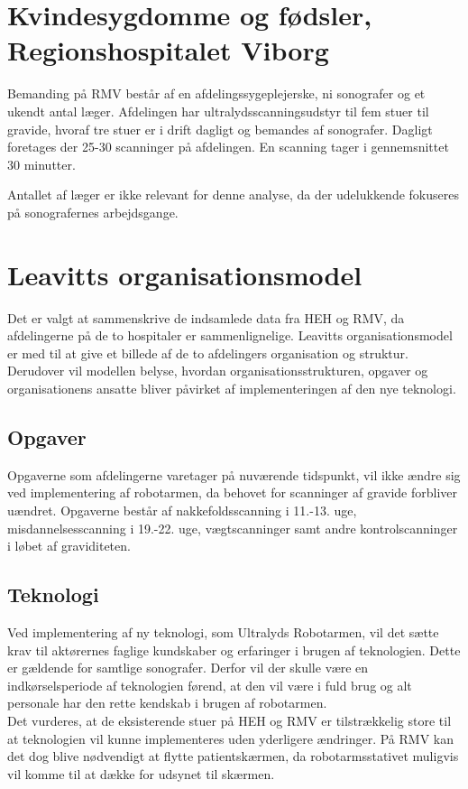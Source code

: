 \section{Kvindesygdomme og fødsler, Regionshospitalet Viborg}
Bemanding på RMV består af en afdelingssygeplejerske, ni sonografer og et ukendt antal læger. Afdelingen har ultralydsscanningsudstyr til fem stuer til gravide, hvoraf tre stuer er i drift dagligt og bemandes af sonografer. Dagligt foretages der 25-30 scanninger på afdelingen. En scanning tager i gennemsnittet 30 minutter.

Antallet af læger er ikke relevant for denne analyse, da der udelukkende fokuseres på sonografernes arbejdsgange.

\section{Leavitts organisationsmodel}
Det er valgt at sammenskrive de indsamlede data fra HEH og RMV, da afdelingerne på de to hospitaler er sammenlignelige. Leavitts organisationsmodel er med til at give et billede af de to afdelingers organisation og struktur. Derudover vil modellen belyse, hvordan organisationsstrukturen, opgaver og organisationens ansatte bliver påvirket af implementeringen af den nye teknologi.


\subsection{Opgaver}
Opgaverne som afdelingerne varetager på nuværende tidspunkt, vil ikke ændre sig ved implementering af robotarmen, da behovet for scanninger af gravide forbliver uændret. Opgaverne består af nakkefoldsscanning i 11.-13. uge, misdannelsesscanning i 19.-22. uge, vægtscanninger samt andre kontrolscanninger i løbet af graviditeten. 

\subsection{Teknologi}
Ved implementering af ny teknologi, som Ultralyds Robotarmen, vil det sætte krav til aktørernes faglige kundskaber og erfaringer i brugen af teknologien. Dette er gældende for samtlige sonografer. Derfor vil der skulle være en indkørselsperiode af teknologien førend, at den vil være i fuld brug og alt personale har den rette kendskab i brugen af robotarmen. \\
Det vurderes, at de eksisterende stuer på HEH og RMV er tilstrækkelig store til at teknologien vil kunne implementeres uden yderligere ændringer. På RMV kan det dog blive nødvendigt at flytte patientskærmen, da robotarmsstativet muligvis vil komme til at dække for udsynet til skærmen.  

